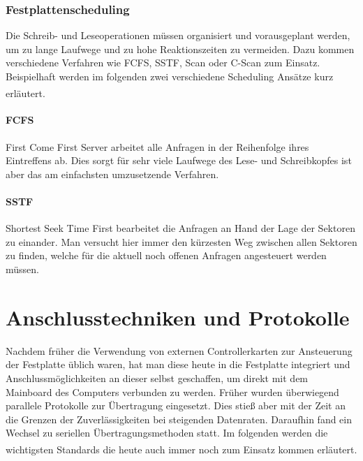 \documentclass[a4paper, DIV20, 12pt, headsepline, parskip, flushleft]{scrartcl}
\begin{document}
\subsubsection{Festplattenscheduling}

Die Schreib- und Leseoperationen müssen organisiert und vorausgeplant werden, um zu lange Laufwege und zu hohe Reaktionszeiten zu vermeiden. Dazu kommen verschiedene Verfahren wie FCFS, SSTF, Scan oder C-Scan zum Einsatz.
Beispielhaft werden im folgenden zwei verschiedene Scheduling Ansätze kurz erläutert.\textsuperscript{\cite{lpbus}}
\paragraph{FCFS} First Come First Server arbeitet alle Anfragen in der Reihenfolge ihres Eintreffens ab. Dies sorgt für sehr viele Laufwege des Lese- und Schreibkopfes ist aber das am einfachsten umzusetzende Verfahren.
\paragraph{SSTF} Shortest Seek Time First bearbeitet die Anfragen an Hand der Lage der Sektoren zu einander. Man versucht hier immer den kürzesten Weg zwischen allen Sektoren zu finden, welche für die aktuell noch offenen Anfragen angesteuert werden müssen.

\section{Anschlusstechniken und Protokolle}
Nachdem früher die Verwendung von externen Controllerkarten zur Ansteuerung der Festplatte üblich waren, hat man diese heute in die Festplatte integriert und Anschlussmöglichkeiten an dieser selbst geschaffen, um direkt mit dem Mainboard des Computers verbunden zu werden.
Früher wurden überwiegend parallele Protokolle zur Übertragung eingesetzt. Dies stieß aber mit der Zeit an die Grenzen der Zuverlässigkeiten bei steigenden Datenraten. Daraufhin fand ein Wechsel zu seriellen Übertragungsmethoden statt. Im folgenden werden die wichtigsten Standards die heute auch immer noch zum Einsatz kommen erläutert.\textsuperscript{\cite{hdd}}
\end{document}
